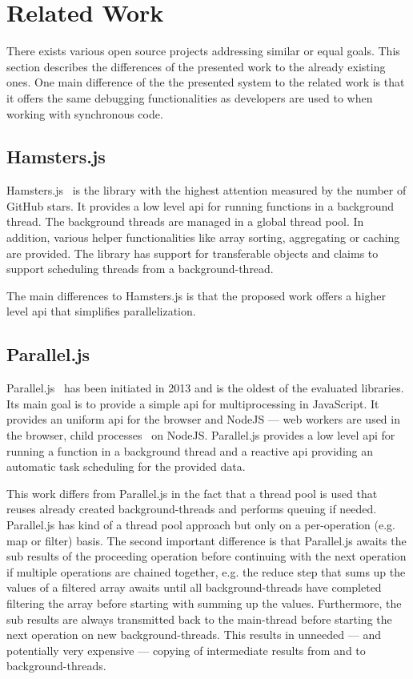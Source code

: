 \section{Related Work}\label{sec:related-work}
There exists various open source projects addressing similar or equal goals. This section describes the differences of the presented work to the already existing ones. One main difference of the the presented system to the related work is that it offers the same debugging functionalities as developers are used to when working with synchronous code.

\subsection{Hamsters.js}
Hamsters.js~\cite{hamstersjs} is the library with the highest attention measured by the number of GitHub stars. It provides a low level api for running functions in a background thread. The background threads are managed in a global thread pool. In addition, various helper functionalities like array sorting, aggregating or caching are provided. The library has support for transferable objects and claims to support scheduling threads from a background-thread. 

The main differences to Hamsters.js is that the proposed work offers a higher level api that simplifies parallelization. 

\subsection{Parallel.js}
Parallel.js~\cite{SavitzkyMayr2016} has been initiated in 2013 and is the oldest of the evaluated libraries. Its main goal is to provide a simple api for multiprocessing in JavaScript. It provides an uniform api for the browser and NodeJS --- web workers are used in the browser, child processes~\cite{childProcess} on NodeJS. Parallel.js provides a low level api for running a function in a background thread and a reactive api providing an automatic task scheduling for the provided data. 

This work differs from Parallel.js in the fact that a thread pool is used that reuses already created background-threads and performs queuing if needed. Parallel.js has kind of a thread pool approach but only on a per-operation (e.g. map or filter) basis. The second important difference is that Parallel.js awaits the sub results of the proceeding operation before continuing with the next operation if multiple operations are chained together, e.g. the reduce step that sums up the values of a filtered array awaits until all background-threads have completed filtering the array before starting with summing up the values. Furthermore, the sub results are always transmitted back to the main-thread before starting the next operation on new background-threads. This results in unneeded --- and potentially very expensive --- copying of intermediate results from and to background-threads.


